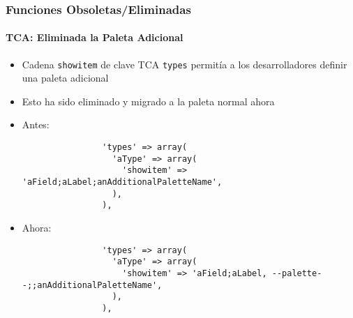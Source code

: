 \begin{frame}[fragile]
	\frametitle{Funciones Obsoletas/Eliminadas}
	\framesubtitle{TCA: Eliminada la Paleta Adicional}

	\lstset{basicstyle=\tiny\ttfamily}

	\begin{itemize}

		\item Cadena \texttt{showitem} de clave TCA \texttt{types} permitía a los desarrolladores definir
			una paleta adicional

		\item Esto ha sido eliminado y migrado a la paleta normal ahora

		\item Antes:

			\begin{lstlisting}
				'types' => array(
				  'aType' => array(
				    'showitem' => 'aField;aLabel;anAdditionalPaletteName',
				  ),
				),
			\end{lstlisting}

		\item Ahora:

			\begin{lstlisting}
				'types' => array(
				  'aType' => array(
				    'showitem' => 'aField;aLabel, --palette--;;anAdditionalPaletteName',
				  ),
				),
			\end{lstlisting}

	\end{itemize}

\end{frame}


